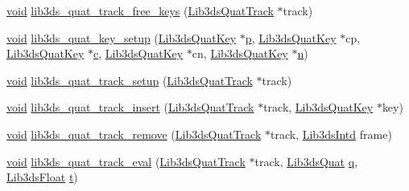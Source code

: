 \begin{DoxyCompactItemize}
\item 
\hyperlink{group___u_a_v_objects_plugin_ga444cf2ff3f0ecbe028adce838d373f5c}{void} \hyperlink{group__tracks_gab2e86513dfaaf70d7b86bf15e6cbe070}{lib3ds\-\_\-quat\-\_\-track\-\_\-free\-\_\-keys} (\hyperlink{struct_lib3ds_quat_track}{Lib3ds\-Quat\-Track} $\ast$track)
\item 
\hyperlink{group___u_a_v_objects_plugin_ga444cf2ff3f0ecbe028adce838d373f5c}{void} \hyperlink{group__tracks_ga86bfa691e68d118215592228e1f7d873}{lib3ds\-\_\-quat\-\_\-key\-\_\-setup} (\hyperlink{struct_lib3ds_quat_key}{Lib3ds\-Quat\-Key} $\ast$\hyperlink{glext_8h_aa5367c14d90f462230c2611b81b41d23}{p}, \hyperlink{struct_lib3ds_quat_key}{Lib3ds\-Quat\-Key} $\ast$cp, \hyperlink{struct_lib3ds_quat_key}{Lib3ds\-Quat\-Key} $\ast$\hyperlink{glext_8h_a1f2d7f8147412c43ba2303a56f97ee73}{c}, \hyperlink{struct_lib3ds_quat_key}{Lib3ds\-Quat\-Key} $\ast$cn, \hyperlink{struct_lib3ds_quat_key}{Lib3ds\-Quat\-Key} $\ast$\hyperlink{glext_8h_a4eacae1d9e7c39f8236bb36d4ececa77}{n})
\item 
\hyperlink{group___u_a_v_objects_plugin_ga444cf2ff3f0ecbe028adce838d373f5c}{void} \hyperlink{group__tracks_gaee6778386db909424677bc98ceb46b1a}{lib3ds\-\_\-quat\-\_\-track\-\_\-setup} (\hyperlink{struct_lib3ds_quat_track}{Lib3ds\-Quat\-Track} $\ast$track)
\item 
\hyperlink{group___u_a_v_objects_plugin_ga444cf2ff3f0ecbe028adce838d373f5c}{void} \hyperlink{group__tracks_gad718d02c1514377fd2c635f7cd9c50b2}{lib3ds\-\_\-quat\-\_\-track\-\_\-insert} (\hyperlink{struct_lib3ds_quat_track}{Lib3ds\-Quat\-Track} $\ast$track, \hyperlink{struct_lib3ds_quat_key}{Lib3ds\-Quat\-Key} $\ast$key)
\item 
\hyperlink{group___u_a_v_objects_plugin_ga444cf2ff3f0ecbe028adce838d373f5c}{void} \hyperlink{group__tracks_ga5badde06bb9fbe6de8c2a2e5e513698a}{lib3ds\-\_\-quat\-\_\-track\-\_\-remove} (\hyperlink{struct_lib3ds_quat_track}{Lib3ds\-Quat\-Track} $\ast$track, \hyperlink{types_8h_a5d92ad41149cf040ce2ee32cc2609403}{Lib3ds\-Intd} frame)
\item 
\hyperlink{group___u_a_v_objects_plugin_ga444cf2ff3f0ecbe028adce838d373f5c}{void} \hyperlink{group__tracks_gaac7f904909f3cfeb3b4068116dbad6e1}{lib3ds\-\_\-quat\-\_\-track\-\_\-eval} (\hyperlink{struct_lib3ds_quat_track}{Lib3ds\-Quat\-Track} $\ast$track, \hyperlink{group__quat_ga9969ef1e618ba698c4b8374f14b548be}{Lib3ds\-Quat} \hyperlink{glext_8h_afb30bc844faa48275d1c84294956a44b}{q}, \hyperlink{types_8h_ab18e70f51f9a53c9dee8d930c8e1a7bf}{Lib3ds\-Float} \hyperlink{glext_8h_a00140d6f5c548b26daf170bf16e86a6d}{t})

\end{DoxyCompactItemize}
